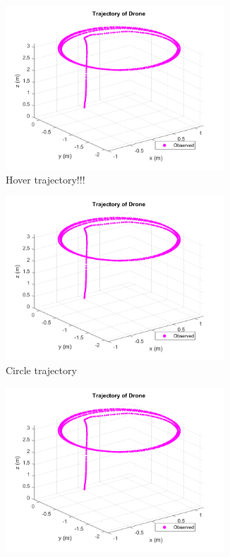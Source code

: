 \documentclass[letterpaper, preprint, paper,11pt]{AAS}	%
\begin{document}
\begin{figure}[H]
\centering
\begin{subfigure}{.3\textwidth}
	\centering
	\includegraphics[width=0.9\textwidth]{../circle1_just_traj}
	\caption{Hover trajectory!!!}
	\label{fig:hover1_just_traj}
\end{subfigure}%
\begin{subfigure}{.3\textwidth}
	\centering
	\includegraphics[width=0.9\textwidth]{../circle1_just_traj}
	\caption{Circle trajectory}
	\label{fig:circle1_just_traj}
\end{subfigure}
\begin{subfigure}{.3\textwidth}
	\centering
	\includegraphics[width=0.9\textwidth]{../circle1_just_traj}

\end{subfigure}
\end{figure}
\end{document}
